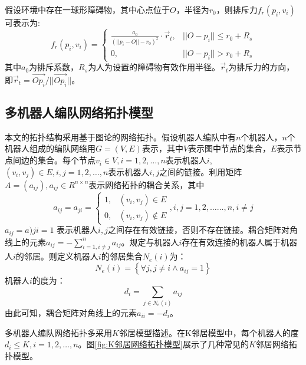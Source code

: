假设环境中存在一球形障碍物，其中心点位于$O$，半径为$r_0$，则排斥力$f_r(p_i,v_i)$可表示为:\\
\begin{equation}
	f_r(p_i,v_i) = \begin{cases}
		\frac{a_0}{{(\lvert\lvert p_i-O \rvert\rvert -r_0)}^2} \cdot \vec{r}_t, & \lvert\lvert O-p_i \rvert\rvert \leq r_0 + R_s \\
		0, &  \lvert\lvert O-p_i \rvert\rvert > r_0 + R_s
	\end{cases}
\end{equation}
其中$a_0$为排斥系数，$R_s$为人为设置的障碍物有效作用半径。$\vec{r}_t$为排斥力的方向，即$\vec{r}_t = \vec{Op_i}/\lvert\lvert\vec{Op_i}\rvert\rvert$。

\subsection{多机器人编队网络拓扑模型}
本文的拓扑结构采用基于图论的网络拓扑。假设机器人编队中有$n$个机器人，$n$个机器人组成的编队网络用$G=(V,E)$表示，其中$V$表示图中节点的集合，$E$表示节点间边的集合。每个节点$v_i\in V, i=1,2,\dots,n$表示机器人$i$, $(v_i,v_j)\in E, i,j=1,2,\dots,n$表示机器人$i,j$之间的链接。利用矩阵$A=(a_{ij}),a_{ij} \in R^{n \times n}$表示网络拓扑的耦合关系，其中\\
\begin{equation}
	a_{ij}=a_{ji} =
	\begin{cases}
		1, & (v_i,v_j) \in E \\
		0, & (v_i,v_j) \notin E
	\end{cases}
	, i,j = 1,2,\dots\dots,n, i \neq j
\end{equation}
$a_{ij} = a){ji} = 1$ 表示机器人$i,j$之间存在有效链接，否则不存在链接。耦合矩阵对角线上的元素$a_{ij} = -\sum_{i=1,i \neq j}^n a_{ij}$。规定与机器人$i$存在有效连接的机器人属于机器人$i$的邻居。则定义机器人$i$的邻居集合$N_e(i)$为：\\
\begin{equation}
	N_e(i) = \left\{ \forall j, j \neq i \wedge a_{ij}=1 \right\}
\end{equation}
机器人$i$的度为：\\
\begin{equation}
	d_i = \sum_{j \in N_e(i)} a_{ij}
\end{equation}
由此可知，耦合矩阵对角线上的元素$a_{ii} = -d_i$。

多机器人编队网络拓扑多采用$K$邻居模型\supercite{xue2004number}描述。在K邻居模型中，每个机器人的度$d_i \leq K, i=1,2, \dots ,n$。图\ref{fig:K邻居网络拓扑模型}展示了几种常见的$K$邻居网络拓扑模型。

